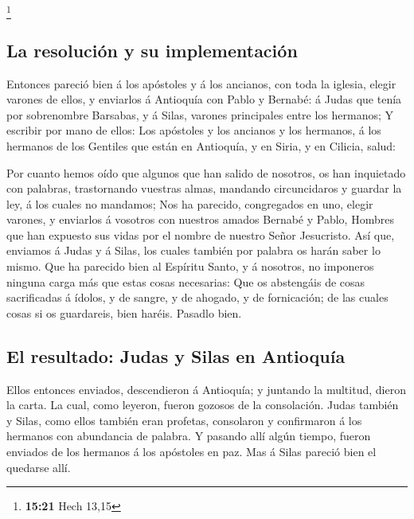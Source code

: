 \footnote{\textbf{15:21} Hech 13,15}

\hypertarget{la-resoluciuxf3n-y-su-implementaciuxf3n}{%
\subsection{La resolución y su
implementación}\label{la-resoluciuxf3n-y-su-implementaciuxf3n}}

 Entonces pareció bien á los apóstoles y á los ancianos,
con toda la iglesia, elegir varones de ellos, y enviarlos á Antioquía
con Pablo y Bernabé: á Judas que tenía por sobrenombre Barsabas, y á
Silas, varones principales entre los hermanos;  Y
escribir por mano de ellos: Los apóstoles y los ancianos y los hermanos,
á los hermanos de los Gentiles que están en Antioquía, y en Siria, y en
Cilicia, salud:

 Por cuanto hemos oído que algunos que han salido de
nosotros, os han inquietado con palabras, trastornando vuestras almas,
mandando circuncidaros y guardar la ley, á los cuales no mandamos;
 Nos ha parecido, congregados en uno, elegir varones, y
enviarlos á vosotros con nuestros amados Bernabé y Pablo,
 Hombres que han expuesto sus vidas por el nombre de
nuestro Señor Jesucristo.  Así que, enviamos á Judas y á
Silas, los cuales también por palabra os harán saber lo mismo.
 Que ha parecido bien al Espíritu Santo, y á nosotros, no
imponeros ninguna carga más que estas cosas necesarias: 
Que os abstengáis de cosas sacrificadas á ídolos, y de sangre, y de
ahogado, y de fornicación; de las cuales cosas si os guardareis, bien
haréis. Pasadlo bien.

\hypertarget{el-resultado-judas-y-silas-en-antioquuxeda}{%
\subsection{El resultado: Judas y Silas en
Antioquía}\label{el-resultado-judas-y-silas-en-antioquuxeda}}

 Ellos entonces enviados, descendieron á Antioquía; y
juntando la multitud, dieron la carta.  La cual, como
leyeron, fueron gozosos de la consolación.  Judas también
y Silas, como ellos también eran profetas, consolaron y confirmaron á
los hermanos con abundancia de palabra.  Y pasando allí
algún tiempo, fueron enviados de los hermanos á los apóstoles en paz.
 Mas á Silas pareció bien el quedarse allí.

